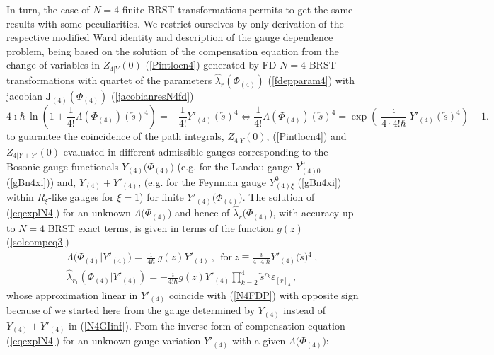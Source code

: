 \documentclass[10pt]{article}
\begin{document}
In turn, the case of  $N=4$ finite BRST transformations permits to get the same results with some peculiarities. We  restrict ourselves by only derivation of the  respective modified Ward identity and description of the gauge dependence problem, being based on the solution of the compensation equation from the change of variables in ${Z}_{4|Y}(0)$ (\ref{Pintlocn4}) generated by FD $N=4$  BRST transformations with quartet of the parameters $\hat{\lambda}{}_r(\Phi_{(4)})$ (\ref{fdepparam4}) with jacobian $\mathbf{J}_{(4)}({\Phi}_{(4)})$ (\ref{jacobianresN4fd})
\begin{equation}
4\imath\hbar\,\mathrm{\ln}\left(
1+\frac{1}{4!}\Lambda(\Phi_{(4)}) (\overleftarrow{s})^{4}\right)
= - \frac{1}{4!} Y'_{(4)} (\overleftarrow{s})^{4}  \Longleftrightarrow  \frac{1}{4!}\Lambda(\Phi_{(4)})(\overleftarrow{s})^{4}=\exp\left(  {\frac{\imath}{4\cdot 4!\hbar}%
} Y'_{(4)}(\overleftarrow{s})^{4}\right)-1 .
\label{eqexplN4}%
\end{equation}
to guarantee the coincidence of the path integrals, ${Z}_{4|Y}(0)$, (\ref{Pintlocn4}) and ${Z}_{4|Y+Y'}(0)$ evaluated in different admissible gauges corresponding to  the Bosonic gauge functionals $Y_{(4)}\big(\Phi_{(4)}\big)$ (e.g. for the Landau gauge $Y^0_{(4)0}$ (\ref{gBn4xi})) and, $Y_{(4)}+Y'_{(4)}$, (e.g. for the Feynman gauge $Y^0_{(4)\xi}$ (\ref{gBn4xi}) within $R_\xi$-like gauges for $\xi=1$) for finite $Y'_{(4)}\big(\Phi_{(4)}\big)$.
The solution of  (\ref{eqexplN4}) for an unknown  $\Lambda\big(
{\Phi}_{(4)}\big)  $ and hence of
$\hat{\lambda}_{r}\big(  {\Phi}_{(4)}\big)  $,
 with accuracy up to $N=4$ BRST exact terms, is given in terms of  the function $g(z)$ (\ref{solcompeq3})
\begin{eqnarray}
&& \Lambda\big({\Phi}_{(4)}|Y'_{(4)}\big)=\frac{\imath}{4\hbar}g(z)Y'_{(4)}\ ,\ \ \mathrm{for}%
\ z\equiv \frac
{i}{4\cdot 4!\hbar}Y'_{(4)}\big(\overleftarrow{s}\big){}^{4}\ , \label{solcompeq4}
\\
&&  \hat{\lambda}_{r_1}\left( {\Phi}_{(4)}|Y'_{(4)}\right)  = - \frac{i}{4!\hbar}g(z)
Y'_{(4)}\prod_{k=2}^4\overleftarrow{s}{}^{r_k} \varepsilon_{[r]_4}  \, , \label{funcdeplafinN4} %
\end{eqnarray}
whose approximation linear in $Y'_{(4)}$ coincide with (\ref{N4FDP}) with  opposite sign because of we  started here  from the gauge determined by $Y_{(4)}$  instead of  $Y_{(4)}+Y'_{(4)}$ in  (\ref{N4GIinf}).
From the inverse form of compensation equation (\ref{eqexplN4})
for an unknown gauge variation $ Y'_{(4)}$ with a given $\Lambda\big( {\Phi}_{(4)}\big) $:
\end{document}
